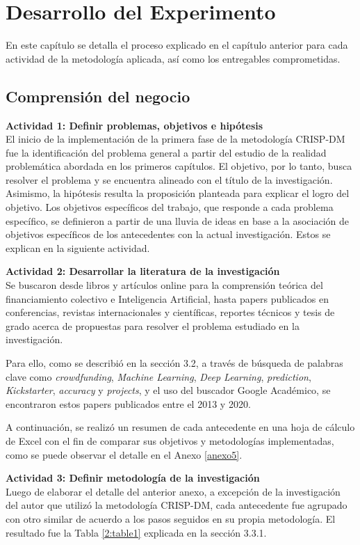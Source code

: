 \chapter{Desarrollo del Experimento}
En este capítulo se detalla el proceso explicado en el capítulo anterior para cada actividad de la metodología aplicada, así como los entregables comprometidas.

\section{Comprensión del negocio}
\textbf{Actividad 1: Definir problemas, objetivos e hipótesis}
\\
El inicio de la implementación de la primera fase de la metodología CRISP-DM fue la identificación del problema general a partir del estudio de la realidad problemática abordada en los primeros capítulos. El objetivo, por lo tanto, busca resolver el problema y se encuentra alineado con el título de la investigación. Asimismo, la hipótesis resulta la proposición planteada para explicar el logro del objetivo. Los objetivos específicos del trabajo, que responde a cada problema específico, se definieron a partir de una lluvia de ideas en base a la asociación de objetivos específicos de los antecedentes con la actual investigación. Estos se explican en la siguiente actividad.

\textbf{Actividad 2: Desarrollar la literatura de la investigación}
\\
Se buscaron desde libros y artículos online para la comprensión teórica del financiamiento colectivo e Inteligencia Artificial, hasta papers publicados en conferencias, revistas internacionales y científicas, reportes técnicos y tesis de grado acerca de propuestas para resolver el problema estudiado en la investigación.

Para ello, como se describió en la sección 3.2, a través de búsqueda de palabras clave como \textit{crowdfunding}, \textit{Machine Learning}, \textit{Deep Learning}, \textit{prediction}, \textit{Kickstarter}, \textit{accuracy} y \textit{projects}, y el uso del buscador Google Académico, se encontraron estos papers publicados entre el 2013 y 2020.

A continuación, se realizó un resumen de cada antecedente en una hoja de cálculo de Excel con el fin de comparar sus objetivos y metodologías implementadas, como se puede observar el detalle en el Anexo \ref{anexo5}.

\textbf{Actividad 3: Definir metodología de la investigación}
\\
Luego de elaborar el detalle del anterior anexo, a excepción de la investigación del autor \cite{pr_fernandezblanco2020crowdfunding_empirical} que utilizó la metodología CRISP-DM, cada antecedente fue agrupado con otro similar de acuerdo a los pasos seguidos en su propia metodología. El resultado fue la Tabla \ref{2:table1} explicada en la sección 3.3.1.

